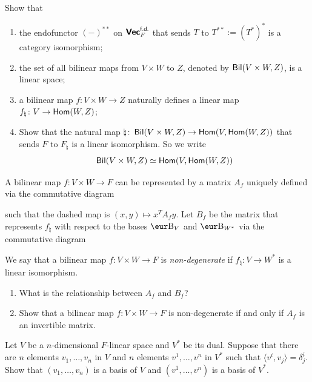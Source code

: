 \begin{problem}
Show that
\begin{enumerate}
  \item the endofunctor ${(-)}^{**}$ on $\operatorname{\text{\normalfont\bf\sffamily Vec}}_F^{\operatorname{\text{\normalfont\sffamily f.d.}}}$ that sends $T$ to $T^{**}:= {(T^*)}^*$ is a category isomorphism;
  \item the set of all bilinear maps from $V \times W$ to $Z$, denoted by $\operatorname{\text{\normalfont\sffamily Bil}}(V \times W, Z)$, is a linear space;
  \item a bilinear map $f: V \times W \to Z$ naturally defines a linear map $f_{\natural} \colon V \to \operatorname{\text{\normalfont\sffamily Hom}}(W, Z)$;
  \item Show that the natural map $\natural \colon \operatorname{\text{\normalfont\sffamily Bil}}(V \times W, Z) \to \operatorname{\text{\normalfont\sffamily Hom}}(V, \operatorname{\text{\normalfont\sffamily Hom}}(W, Z))$ that sends $F$ to $F_{\natural}$ is a linear isomorphism. So we write \[ \operatorname{\text{\normalfont\sffamily Bil}}(V \times W, Z) \simeq \operatorname{\text{\normalfont\sffamily Hom}}(V, \operatorname{\text{\normalfont\sffamily Hom}}(W, Z)) \]
\end{enumerate}
A bilinear map $f: V \times W \to F$ can be represented by a matrix $A_f$ uniquely defined via the commutative diagram
\begin{center}
\end{center}
such that the dashed map is $(x, y) \mapsto x^T A_f y$.
Let $B_f$ be the matrix that represents $f_{\natural}$ with respect to the bases $\B_V$ and $\B_{W^*}$ via the commutative diagram
\begin{center}
\end{center}
We say that a bilinear map $f: V \times W \to F$ is \emph{non-degenerate} if $f_{\natural}: V \to W^*$ is a linear isomorphism.
\begin{enumerate}[resume]
  \item What is the relationship between $A_f$ and $B_f$?
  \item Show that a bilinear map $f: V \times W \to F$ is non-degenerate if and only if $A_f$ is an invertible matrix.
\end{enumerate}
\end{problem}

\begin{problem}
Let $V$ be a $n$-dimensional $F$-linear space and $V^*$ be its dual. Suppose that there are $n$ elements $v_1, \ldots, v_n$ in $V$ and $n$ elements $v^1, \ldots, v^n$ in $V^*$ such that $\langle v^i, v_j \rangle = \delta^i_j$. Show that $(v_1, \ldots, v_n)$ is a basis of $V$ and $(v^1, \ldots, v^n)$ is a basis of $V^*$.
\end{problem}

